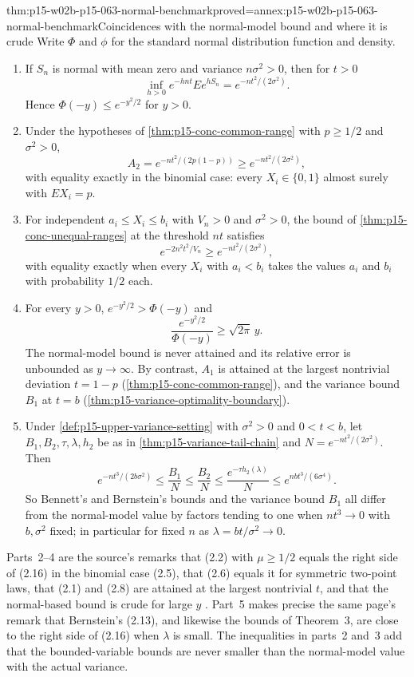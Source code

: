\begin{hbtheorem}{thm:p15-w02b-p15-063-normal-benchmark}{proved=annex:p15-w02b-p15-063-normal-benchmark}{Coincidences with the normal-model bound and where it is crude}
Write \(\Phi\) and \(\phi\) for the standard normal distribution function
and density.
\begin{enumerate}
\item If \(S_n\) is normal with mean zero and variance \(n\sigma^2>0\), then
 for \(t>0\)
 \[
       \inf_{h>0}e^{-hnt}Ee^{hS_n}=e^{-nt^2/(2\sigma^2)}.
 \]
 Hence \(\Phi(-y)\leq e^{-y^2/2}\) for \(y>0\).
\item Under the hypotheses of \cref{thm:p15-conc-common-range} with
 \(p\geq1/2\) and \(\sigma^2>0\),
 \[
       A_2=e^{-nt^2/(2p(1-p))}\geq e^{-nt^2/(2\sigma^2)},
 \]
 with equality exactly in the binomial case: every \(X_i\in\{0,1\}\)
 almost surely with \(EX_i=p\).
\item For independent \(a_i\leq X_i\leq b_i\) with \(V_n>0\) and
 \(\sigma^2>0\), the bound of \cref{thm:p15-conc-unequal-ranges} at the
 threshold \(nt\) satisfies
 \[
       e^{-2n^2t^2/V_n}\geq e^{-nt^2/(2\sigma^2)},
 \]
 with equality exactly when every \(X_i\) with \(a_i<b_i\) takes the values
 \(a_i\) and \(b_i\) with probability \(1/2\) each.
\item For every \(y>0\), \(e^{-y^2/2}>\Phi(-y)\) and
 \[
       \frac{e^{-y^2/2}}{\Phi(-y)}\geq\sqrt{2\pi}\,y .
 \]
 The normal-model bound is never attained and its relative error is
 unbounded as \(y\to\infty\). By contrast, \(A_1\) is attained at the
 largest nontrivial deviation \(t=1-p\) (\cref{thm:p15-conc-common-range}),
 and the variance bound \(B_1\) at \(t=b\)
 (\cref{thm:p15-variance-optimality-boundary}).
\item Under \cref{def:p15-upper-variance-setting} with \(\sigma^2>0\) and
 \(0<t<b\), let \(B_1,B_2,\tau,\lambda,h_2\) be as in
 \cref{thm:p15-variance-tail-chain} and \(N=e^{-nt^2/(2\sigma^2)}\). Then
 \[
  e^{-nt^3/(2b\sigma^2)}\leq\frac{B_1}N\leq\frac{B_2}N
   \leq\frac{e^{-\tau h_2(\lambda)}}N\leq e^{nbt^3/(6\sigma^4)} .
 \]
 So Bennett's and Bernstein's bounds and the variance bound \(B_1\) all
 differ from the normal-model value by factors tending to one when
 \(nt^3\to0\) with \(b,\sigma^2\) fixed; in particular for fixed \(n\) as
 \(\lambda=bt/\sigma^2\to0\).
\end{enumerate}
Parts~2--4 are the source's remarks that (2.2) with \(\mu\geq1/2\)
equals the right side of (2.16) in the binomial case (2.5), that (2.6)
equals it for symmetric two-point laws, that (2.1) and (2.8) are attained
at the largest nontrivial \(t\), and that the normal-based bound is crude
for large \(y\) \cite[p.~17]{Hoeffding1963BoundedSums}. Part~5 makes
precise the same page's remark that Bernstein's (2.13), and likewise the
bounds of Theorem~3, are close to the right side of (2.16) when
\(\lambda\) is small. The inequalities in parts~2 and~3 add that the bounded-variable bounds are never smaller
than the normal-model value with the actual variance.
\end{hbtheorem}

